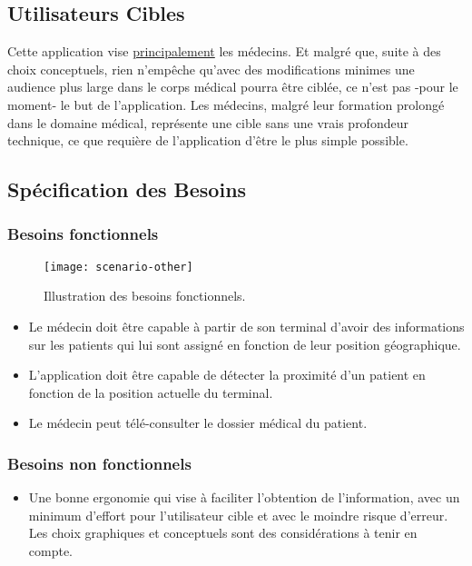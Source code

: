 \subsection{Utilisateurs Cibles}

Cette application vise \underline{principalement} les médecins. Et
malgré que, suite à des choix conceptuels, rien n’empêche qu’avec des
modifications minimes une audience plus large dans le corps médical
pourra être ciblée, ce n’est pas -pour le moment- le but de
l’application. Les médecins, malgré leur formation prolongé dans le
domaine médical, représente une cible sans une vrais profondeur
technique, ce que requière de l’application d’être le plus simple
possible.

\subsection{Spécification des Besoins}

\subsubsection{Besoins fonctionnels}

\begin{figure}
\center
\texttt{[image: scenario-other]}
\caption{Illustration des besoins fonctionnels.}
\end{figure}

\begin{itemize}

\item Le médecin doit être capable à partir de son terminal d’avoir des
informations sur les patients qui lui sont assigné en fonction de leur position
géographique.

\item L'application doit être capable de détecter la proximité d'un
patient en fonction de la position actuelle du terminal.

\item Le médecin peut télé-consulter le dossier médical du patient.

\end{itemize}

\subsubsection{Besoins non fonctionnels}

\begin{itemize}

\item Une bonne ergonomie qui vise à faciliter l'obtention de
l'information, avec un minimum d'effort pour l'utilisateur cible et
avec le moindre risque d'erreur. Les choix graphiques et conceptuels
sont des considérations à tenir en compte.

\end{itemize}

